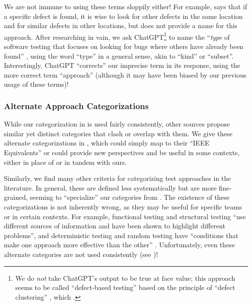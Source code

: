We are not immune to using these terms sloppily either! For example,
\citet[p.~88]{Patton2006} says that if a specific defect is found, it is wise
to look for other defects in the same location and for similar defects in other
locations, but does not provide a name for this approach. After researching in
vain, we ask ChatGPT\footnote{We do \emph{not} take ChatGPT's output to be
    true at face value; this approach seems to be called ``defect-based
    testing'' based on the principle of ``defect clustering''
    \citep{ChatGPT2024}, which \citet{RusEtAl2008} .}
to name the ``\emph{type} of software testing that focuses on looking for bugs
where others have already been found''
\ifnotpaper \citep[emphasis added]{ChatGPT2024}\else \cite{ChatGPT2024}\fi%
,
using the word ``type'' in a general sense, akin to ``kind'' or ``subset''.
Interestingly, ChatGPT ``corrects'' our imprecise term in its response,
using the more correct term ``approach'' (although it may have been biased by
our previous usage of these terms)!

\subsubsection{Alternate Approach Categorizations}\label{alt-cats}

While our categorization in  is used fairly consistently,
other sources \citep[such as][]{SWEBOK2024,BarbosaEtAl2006} propose similar yet
distinct categories that clash or overlap with them. We give these alternate
categorizations in , which could simply map to their
``IEEE Equivalents'' or could provide new perspectives and be useful in some
contexts, either in place of or in tandem with ours.

\afterpage{\begin{landscape}%
        \otherCatsTable{}%
    \end{landscape}}

Similarly, we find many other criteria for categorizing test approaches in
the literature.
In general, these are defined less systematically but are more fine-grained,
seeming to ``specialize'' our categories from . The
existence of these categorizations
is not inherently wrong, as they may be useful for specific teams or in
certain contexts. For example, functional testing and structural testing
``use different sources of information and have been shown to highlight
different problems'', and deterministic testing and random testing have
``conditions that make one approach more effective than the other''
\citep[p.~5\=/16]{SWEBOK2024}. Unfortunately, even these alternate
categories are not used consistently (see )!


